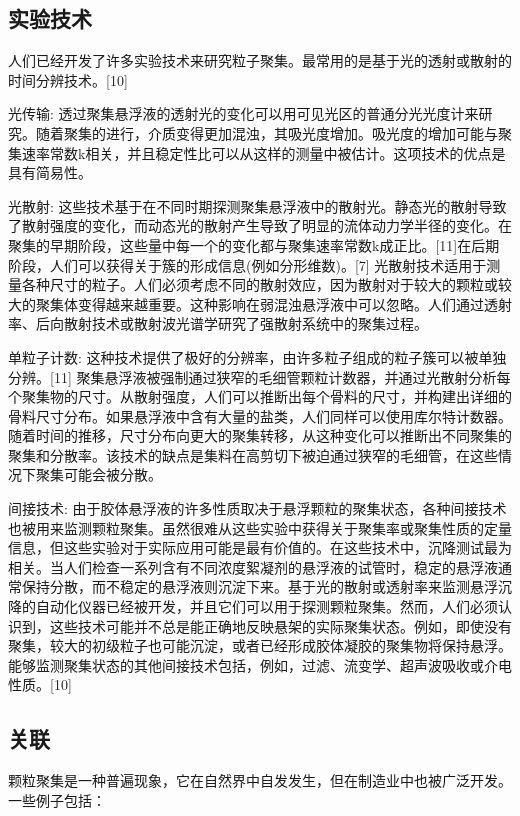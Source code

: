 \subsection{实验技术}
人们已经开发了许多实验技术来研究粒子聚集。最常用的是基于光的透射或散射的时间分辨技术。[10]

光传输: 透过聚集悬浮液的透射光的变化可以用可见光区的普通分光光度计来研究。随着聚集的进行，介质变得更加混浊，其吸光度增加。吸光度的增加可能与聚集速率常数k相关，并且稳定性比可以从这样的测量中被估计。这项技术的优点是具有简易性。

光散射: 这些技术基于在不同时期探测聚集悬浮液中的散射光。静态光的散射导致了散射强度的变化，而动态光的散射产生导致了明显的流体动力学半径的变化。在聚集的早期阶段，这些量中每一个的变化都与聚集速率常数k成正比。[11]在后期阶段，人们可以获得关于簇的形成信息(例如分形维数)。[7] 光散射技术适用于测量各种尺寸的粒子。人们必须考虑不同的散射效应，因为散射对于较大的颗粒或较大的聚集体变得越来越重要。这种影响在弱混浊悬浮液中可以忽略。人们通过透射率、后向散射技术或散射波光谱学研究了强散射系统中的聚集过程。

单粒子计数: 这种技术提供了极好的分辨率，由许多粒子组成的粒子簇可以被单独分辨。[11] 聚集悬浮液被强制通过狭窄的毛细管颗粒计数器，并通过光散射分析每个聚集物的尺寸。从散射强度，人们可以推断出每个骨料的尺寸，并构建出详细的骨料尺寸分布。如果悬浮液中含有大量的盐类，人们同样可以使用库尔特计数器。随着时间的推移，尺寸分布向更大的聚集转移，从这种变化可以推断出不同聚集的聚集和分散率。该技术的缺点是集料在高剪切下被迫通过狭窄的毛细管，在这些情况下聚集可能会被分散。

间接技术: 由于胶体悬浮液的许多性质取决于悬浮颗粒的聚集状态，各种间接技术也被用来监测颗粒聚集。虽然很难从这些实验中获得关于聚集率或聚集性质的定量信息，但这些实验对于实际应用可能是最有价值的。在这些技术中，沉降测试最为相关。当人们检查一系列含有不同浓度絮凝剂的悬浮液的试管时，稳定的悬浮液通常保持分散，而不稳定的悬浮液则沉淀下来。基于光的散射或透射率来监测悬浮沉降的自动化仪器已经被开发，并且它们可以用于探测颗粒聚集。然而，人们必须认识到，这些技术可能并不总是能正确地反映悬架的实际聚集状态。例如，即使没有聚集，较大的初级粒子也可能沉淀，或者已经形成胶体凝胶的聚集物将保持悬浮。能够监测聚集状态的其他间接技术包括，例如，过滤、流变学、超声波吸收或介电性质。[10]

\subsection{关联}
颗粒聚集是一种普遍现象，它在自然界中自发发生，但在制造业中也被广泛开发。一些例子包括：

